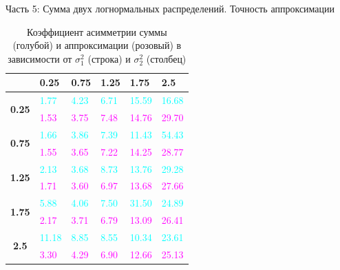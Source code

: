 \documentclass[ucs, notheorems, handout]{beamer}
\begin{document}
	\begin{frame}{Часть 5: Сумма двух логнормальных распределений. Точность аппроксимации}
		
		\begin{table}[]
			\caption{Коэффициент асимметрии суммы (голубой) и аппроксимации (розовый) в зависимости от $\sigma_{1}^{2}$ (строка) и $\sigma_{2}^{2}$ (столбец) }
			\begin{tabular}{|c|l|l|l|l|l|}
				\hline
				& \textbf{0.25} & \textbf{0.75} & \textbf{1.25} & \textbf{1.75} & \textbf{2.5} \\ \hline
				\multirow{2}{*}{\textbf{0.25}} & \textcolor{cyan}{1.77}          & \textcolor{cyan}{4.23}          & \textcolor{cyan}{6.71}          & \textcolor{cyan}{15.59}         & \textcolor{cyan}{16.68}        \\ \cline{2-6} 
				& \textcolor{magenta}{1.53}          & \textcolor{magenta}{3.75}          & \textcolor{magenta}{7.48}          & \textcolor{magenta}{14.76}         & \textcolor{magenta}{29.70}        \\ \hline
				\multirow{2}{*}{\textbf{0.75}} & \textcolor{cyan}{1.66}          & \textcolor{cyan}{3.86}          & \textcolor{cyan}{7.39}          & \textcolor{cyan}{11.43}         & \textcolor{cyan}{54.43}        \\ \cline{2-6} 
				& \textcolor{magenta}{1.55}          & \textcolor{magenta}{3.65}          & \textcolor{magenta}{7.22}          & \textcolor{magenta}{14.25}         & \textcolor{magenta}{28.77}        \\ \hline
				\multirow{2}{*}{\textbf{1.25}} & \textcolor{cyan}{2.13}          & \textcolor{cyan}{3.68}          & \textcolor{cyan}{8.73}          & \textcolor{cyan}{13.76}         & \textcolor{cyan}{29.28}        \\ \cline{2-6} 
				& \textcolor{magenta}{1.71}          & \textcolor{magenta}{3.60}          & \textcolor{magenta}{6.97}          & \textcolor{magenta}{13.68}         & \textcolor{magenta}{27.66}        \\ \hline
				\multirow{2}{*}{\textbf{1.75}} & \textcolor{cyan}{5.88}          & \textcolor{cyan}{4.06}          & \textcolor{cyan}{7.50}          & \textcolor{cyan}{31.50}         & \textcolor{cyan}{24.89}        \\ \cline{2-6} 
				& \textcolor{magenta}{2.17}          & \textcolor{magenta}{3.71}          & \textcolor{magenta}{6.79}          & \textcolor{magenta}{13.09}         & \textcolor{magenta}{26.41}        \\ \hline
				\multirow{2}{*}{\textbf{2.5}}  & \textcolor{cyan}{11.18}         & \textcolor{cyan}{8.85}          & \textcolor{cyan}{8.55}          & \textcolor{cyan}{10.34}         & \textcolor{cyan}{23.61}        \\ \cline{2-6} 
				& \textcolor{magenta}{3.30}          & \textcolor{magenta}{4.29}          & \textcolor{magenta}{6.90}          & \textcolor{magenta}{12.66}         & \textcolor{magenta}{25.13}        \\ \hline
			\end{tabular}
		\end{table}
		

\end{frame}
\end{document}
